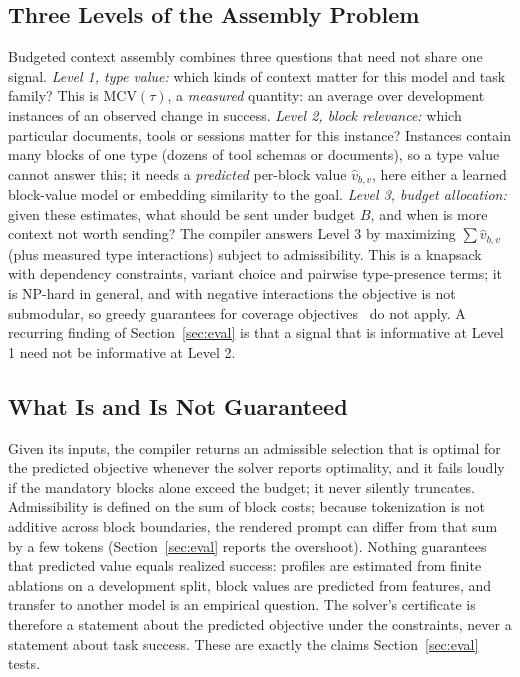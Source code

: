 \subsection{Three Levels of the Assembly Problem}
Budgeted context assembly combines three questions that need not share one signal.
\emph{Level 1, type value:} which kinds of context matter for this model and task family? This is
$\mathrm{MCV}(\tau)$, a \emph{measured} quantity: an average over development instances of an observed change in success.
\emph{Level 2, block relevance:} which particular documents, tools or sessions matter for this instance? Instances
contain many blocks of one type (dozens of tool schemas or documents), so a type value cannot answer this; it needs a
\emph{predicted} per-block value $\hat v_{b,v}$, here either a learned block-value model or embedding similarity to the
goal. \emph{Level 3, budget allocation:} given these estimates, what should be sent under budget $B$, and when is more
context not worth sending? The compiler answers Level 3 by maximizing $\sum \hat v_{b,v}$ (plus measured type
interactions) subject to admissibility. This is a knapsack with dependency constraints, variant choice and pairwise
type-presence terms; it is NP-hard in general, and with negative interactions the objective is not submodular, so greedy
guarantees for coverage objectives~\citep{pacms2026,skillselect2026} do not apply. A recurring finding of
Section~\ref{sec:eval} is that a signal that is informative at Level 1 need not be informative at Level 2.

\subsection{What Is and Is Not Guaranteed}
Given its inputs, the compiler returns an admissible selection that is optimal for the predicted objective whenever the
solver reports optimality, and it fails loudly if the mandatory blocks alone exceed the budget; it never silently
truncates. Admissibility is defined on the sum of block costs; because tokenization is not additive across block
boundaries, the rendered prompt can differ from that sum by a few tokens (Section~\ref{sec:eval} reports the overshoot). Nothing guarantees that predicted value equals realized success: profiles are estimated from finite ablations
on a development split, block values are predicted from features, and transfer to another model is an empirical
question. The solver's certificate is therefore a statement about the predicted objective under the constraints, never a
statement about task success. These are exactly the claims Section~\ref{sec:eval} tests.
